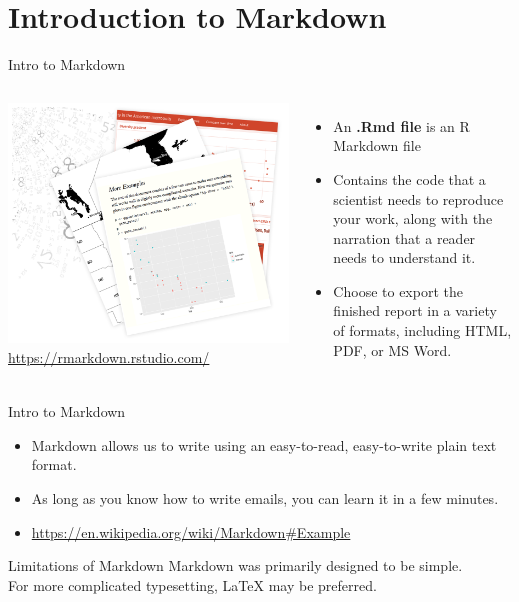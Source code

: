 \documentclass{beamer}
\begin{document}
\section{Introduction to Markdown}
\begin{frame}{Intro to Markdown}
\begin{columns}[t, onlytextwidth]

\vfill
\includegraphics[width=\textwidth]{markdown-examples.png}
\vfill
{\footnotesize \url{https://rmarkdown.rstudio.com/}}

    \begin{itemize}
        \item An \textbf{.Rmd file} is an R Markdown file
        \item Contains the code that a scientist needs to reproduce your work, along with the narration that a reader needs to understand it.
        \item Choose to export the finished report in a variety of formats, including HTML, PDF, or MS Word.
    \end{itemize}

\end{columns}
\end{frame}

\begin{frame}{Intro to Markdown}
\begin{itemize}
    \item Markdown allows us to write using an easy-to-read, easy-to-write plain text format.
    \item As long as you know how to write emails, you can learn it in a few minutes.
    \item \url{https://en.wikipedia.org/wiki/Markdown\#Example}
\end{itemize}
\begin{alertblock}{Limitations of Markdown}
Markdown was primarily designed to be simple. \\ For more complicated typesetting, LaTeX may be preferred.
\end{alertblock}
\end{frame}
\end{document}

